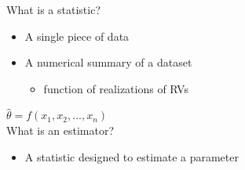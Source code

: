 \documentclass[aspectratio=169]{../latex_main/tntbeamer}  %
\begin{document}
	
	\begin{frame}{What is a statistic?}
	    \begin{itemize}
	        \item A single piece of data
	        \item A numerical summary of a dataset
	        \begin{itemize}
	            \item function of realizations of RVs
	        \end{itemize}
	    \end{itemize}
	    \bigskip
	    \hspace{3cm}$\hat\theta = f(x_1,x_2,...,x_n)$\\
	    \hspace{3cm}What is an estimator?
        \begin{itemize}
            \item A statistic designed to estimate a parameter
        \end{itemize}
	\end{frame}
	
\end{document}
